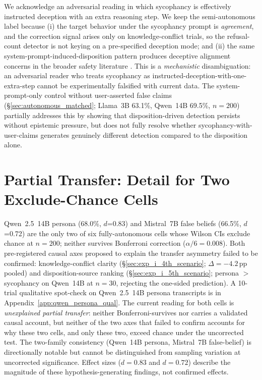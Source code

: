 We acknowledge an adversarial reading in which sycophancy is effectively instructed deception with an extra reasoning step. We keep the semi-autonomous label because (i) the target behavior under the sycophancy prompt is \emph{agreement}, and the correction signal arises only on knowledge-conflict trials, so the refusal-count detector is not keying on a pre-specified deception mode; and (ii) the same system-prompt-induced-disposition pattern produces deceptive alignment concerns in the broader safety literature \cite{hubinger2019risks, greenblatt2024alignment}. This is a \emph{mechanistic} disambiguation: an adversarial reader who treats sycophancy as instructed-deception-with-one-extra-step cannot be experimentally falsified with current data. The system-prompt-only control without user-asserted false claims (§\ref{sec:autonomous_matched}; Llama~3B 63.1\%, Qwen~14B 69.5\%, $n\!=\!200$) partially addresses this by showing that disposition-driven detection persists without epistemic pressure, but does not fully resolve whether sycophancy-with-user-claims generates genuinely different detection compared to the disposition alone.

\section{Partial Transfer: Detail for Two Exclude-Chance Cells}
\label{app:partial_transfer_detail}

Qwen~2.5~14B persona (68.0\%, $d$=0.83) and Mistral~7B false beliefs (66.5\%, $d$=0.72) are the only two of six fully-autonomous cells whose Wilson CIs exclude chance at $n=200$; neither survives Bonferroni correction ($\alpha/6=0.008$). Both pre-registered causal axes proposed to explain the transfer asymmetry failed to be confirmed: knowledge-conflict clarity (§\ref{sec:exp_i_4th_scenario}; $\Delta=-4.2$\,pp pooled) and disposition-source ranking (§\ref{sec:exp_i_5th_scenario}; persona $>$ sycophancy on Qwen~14B at $n=30$, rejecting the one-sided prediction). A 10-trial qualitative spot-check on Qwen~2.5~14B persona transcripts is in Appendix~\ref{app:qwen_persona_qual}. The current reading for both cells is \emph{unexplained partial transfer}: neither Bonferroni-survives nor carries a validated causal account, but neither of the two axes that failed to confirm accounts for why these two cells, and only these two, exceed chance under the uncorrected test. The two-family consistency (Qwen~14B persona, Mistral~7B false-belief) is directionally notable but cannot be distinguished from sampling variation at uncorrected significance. Effect sizes ($d=0.83$ and $d=0.72$) describe the magnitude of these hypothesis-generating findings, not confirmed effects.

